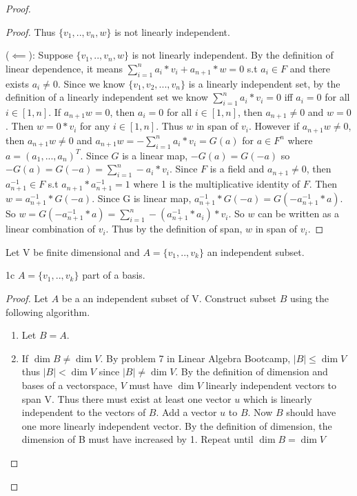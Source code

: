\documentclass{article}
\newcommand{\abs}[1]{\lvert #1\rvert}
\begin{document}
\begin{proof}
\begin{proof}
		Thus $\{v_1,..,v_n,w\}$ is not linearly independent.


		($\impliedby$): Suppose $\{v_1,..,v_n,w\}$ is not linearly independent. By the definition of linear dependence, it means $\sum_{i = 1}^{n} a_i * v_i + a_{n+1}*w = 0$ s.t $a_i \in F$ and there exists $a_i \neq 0$. Since we know $\{v_1, v_2, ..., v_n\}$ is a linearly independent set, by the definition of a linearly independent set we know $\sum_{i=1}^n a_i * v_i = 0$ iff $a_i = 0$ for all $i \in [1, n]$. If $a_{n + 1} w = 0$, then $a_i = 0$ for all $i \in [1, n]$, then $a_{n+1} \neq 0$ and $w = 0$. Then $w = 0 * v_i$ for any $i \in [1, n]$. Thus $w$ in span of $v_i$. However if $a_{n + 1} w \neq 0$, then $a_{n + 1} w \neq 0$ and $a_{n + 1} w = -\sum_{i=1}^n a_i * v_i = G(a)$ for $a \in F^n$ where $a = (a_1, ..., a_n)^T$. Since $G$ is a linear map, $-G(a) = G(-a)$ so $-G(a) = G(-a) = \sum_{i=1}^n -a_i * v_i$. Since $F$ is a field and $a_{n+1} \neq 0$, then $a_{n+1}^{-1} \in F$ s.t $a_{n+1} * a_{n+1}^{-1} = 1$ where 1 is the multiplicative identity of $F$. Then $w = a_{n+1}^{-1} * G(-a)$. Since G is linear map, $a_{n+1}^{-1} * G(-a) = G(-a_{n+1}^{-1} * a)$. So $w = G(-a_{n+1}^{-1} * a) = \sum_{i=1}^n -(a_{n+1}^{-1} * a_i) * v_i$. So $w$ can be written as a linear combination of $v_i$. Thus by the definition of span, $w$ in span of $v_i$.

	\end{proof}

	Let V be finite dimensional and $A = \{v_1,..,v_k\}$ an independent subset.

	\begin{claim}{1c}
		$A = \{v_1,..,v_k\}$ part of a basis.
	\end{claim}
	\begin{proof}
		Let $A$ be a an independent subset of V. Construct subset $B$ using the following algorithm.

		\begin{enumerate}
			\item Let $B = A$.
			\item If $\dim {B} \neq \dim V$. By problem 7 in Linear Algebra Bootcamp, $\abs{B} \leq \dim V$ thus $\abs{B} < \dim V$ since $\abs{B} \neq \dim V$. By the definition of dimension and bases of a vectorspace, $V$ must have $\dim{V}$ linearly independent vectors to span V. Thus there must exist at least one vector $u$ which is linearly independent to the vectors of $B$. Add a vector $u$ to $B$. Now $B$ should have one more linearly independent vector. By the definition of dimension, the dimension of B must have increased by 1. Repeat until $\dim {B} = \dim V$
		\end{enumerate}


\end{proof}
\end{proof}
\end{document}
